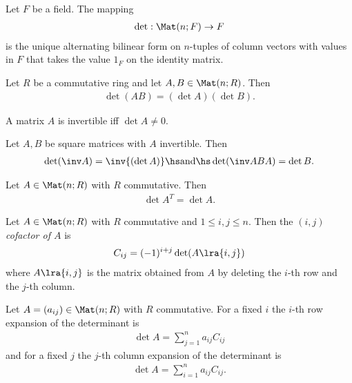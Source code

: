 \documentclass{article}
\begin{document}
\begin{theorem}[Theorem 4.3.6]
	Let $F$ be a field. The mapping
	\begin{align*}
		\det : \Mat(n; F) \to F
	\end{align*}
	is the unique alternating bilinear form on $n$-tuples of column vectors with values in $F$
	that takes the value $1_F$ on the identity matrix.
\end{theorem}

\begin{theorem}[Theorem 4.4.1]
	Let $R$ be a commutative ring and let $A,B\in\Mat(n; R)$. Then
	\begin{align*}
		\det (AB) = (\det A) (\det B).
	\end{align*}
\end{theorem}

\begin{theorem}[Theorem 4.4.2]
	A matrix $A$ is invertible iff $\det A \not= 0$.
\end{theorem}

\begin{corollary}
	Let $A,B$ be square matrices with $A$ invertible. Then
	\begin{align*}
		\det (\inv A) = \inv{(\det A)} \hs\text{and}\hs
		\det (\inv ABA) = \det B.
	\end{align*}
\end{corollary}

\begin{lemma}[Lemma 4.4.4]
	Let $A\in\Mat(n;R)$ with $R$ commutative. Then
	\begin{align*}
		\det A^T = \det A.
	\end{align*}
\end{lemma}

\begin{definition}
	Let $A\in\Mat(n;R)$ with $R$ commutative and $1\leq i,j\leq n$.  Then the \emph{$(i,j)$ cofactor of $A$} is
	\begin{align*}
		C_{ij}=(-1)^{i+j}\det(A\lra{i,j})
	\end{align*}
	where $A\lra{i,j}$ is the matrix obtained from $A$ by deleting the $i$-th row and the $j$-th column.
\end{definition}

\begin{theorem}[Theorem 4.4.7]
	Let $A=(a_{ij})\in\Mat(n; R)$ with $R$ commutative. For a fixed $i$ the $i$-th row expansion
	of the determinant is
	\begin{align*}
		\det A = \sum_{j=1}^n a_{ij}C_{ij}
	\end{align*}
	and for a fixed $j$ the $j$-th column expansion of the determinant is
	\begin{align*}
		\det A = \sum_{i=1}^n a_{ij}C_{ij}.
	\end{align*}
\end{theorem}
\end{document}
